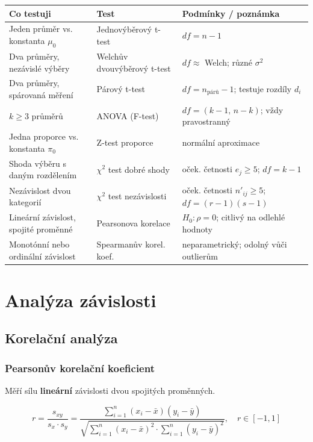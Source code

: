 \documentclass[a4paper, 11pt]{article}
\begin{document}
{\small
\renewcommand{\arraystretch}{1.3}
\begin{tabular}{p{} p{} p{}}
	\textbf{Co testuji} & \textbf{Test} & \textbf{Podmínky / poznámka} \\
	\midrule
	Jeden průměr vs. konstanta $\mu_0$ & Jednovýběrový t-test & $df = n-1$ \\
	Dva průměry, nezávislé výběry & Welchův dvouvýběrový t-test & $df \approx$ Welch; různé $\sigma^2$ \\
	Dva průměry, spárovaná měření & Párový t-test & $df = n_{\text{párů}}-1$; testuje rozdíly $d_i$ \\
	$k \ge 3$ průměrů & ANOVA (F-test) & $df = (k-1,\, n-k)$; vždy pravostranný \\
	Jedna proporce vs. konstanta $\pi_0$ & Z-test proporce & normální aproximace \\
	Shoda výběru s daným rozdělením & $\chi^2$ test dobré shody & oček. četnosti $e_j \ge 5$;\; $df = k-1$ \\
	Nezávislost dvou kategorií & $\chi^2$ test nezávislosti & oček. četnosti $n'_{ij} \ge 5$;\; $df = (r-1)(s-1)$ \\
	Lineární závislost, spojité proměnné & Pearsonova korelace & $H_0: \rho = 0$; citlivý na odlehlé hodnoty \\
	Monotónní nebo ordinální závislost & Spearmanův korel. koef. & neparametrický; odolný vůči outlierům \\
\end{tabular}}


\section{Analýza závislosti}

\subsection{Korelační analýza}

\subsubsection{Pearsonův korelační koeficient}

Měří sílu \textbf{lineární} závislosti dvou spojitých proměnných.

\begin{equation*}
	r = \frac{s_{xy}}{s_x \cdot s_y}
	= \frac{\sum_{i=1}^n (x_i - \bar{x})(y_i - \bar{y})}{\sqrt{\sum_{i=1}^n (x_i - \bar{x})^2 \cdot \sum_{i=1}^n (y_i - \bar{y})^2}},
	\quad r \in [-1, 1]
\end{equation*}
\end{document}

